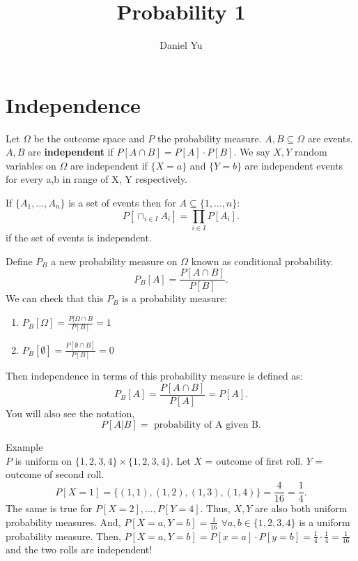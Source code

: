 \documentclass[a4paper]{article}
\title{\Huge{Probability 1}}
\author{\huge{Daniel Yu}}
\date{}
\begin{document}
\maketitle
\newpage%
\tableofcontents
\pagebreak
\section{Independence}

\begin{definition}
 Let $\Omega$ be the outcome space and $P$ the probability measure. $A,B \subseteq \Omega$ are events. $A,B$
 are \textbf{independent} if $P[A \cap B] = P[A] \cdot P[B]$. We say $X,Y$ random variables on $\Omega$ are independent
 if $\{X = a\}$ and $\{Y = b\}$ are independent events for every a,b in range of X, Y respectively.   
\end{definition}

\begin{theorem}
  If $\{A_1, \ldots, A_n\} $ is a set of events then for $A \subseteq \{1,\ldots,n\} $:
  \[
    P[\cap_{i \in I} A_i] = \prod_{i \in I} P[A_{i}]
  .\] 
  if the set of events is independent.
\end{theorem}

\begin{definition}
  Define  $P_B$ a new probability measure on  $\Omega$ known as conditional probability.
   \[
     P_B[A] = \frac{P[A\cap B]}{P[B]}
  .\] 
  We can check that this $P_B$ is a probability measure:
   \begin{enumerate}
     \item $P_B [\Omega] = \frac{P[\Omega \cap B}{P[B]} = 1$ 
     \item $P_B[\emptyset] = \frac{P[\emptyset \cap B]}{P[B]} = 0$ 
  \end{enumerate}
  Then independence in terms of this probability measure is defined as:
  \[
    P_B[A] = \frac{P[A \cap B]}{P[A]} = P[A]
  .\]
  You will also see the notation,
  \[
    P[A|B] = \text{ probability of A given B}
  .\] 
\end{definition}

\begin{note}{Example} \\
  $P$ is uniform on  $\{1,2,3,4\} \times \{1,2,3,4\}$. Let $X$ = outcome of first roll. $Y$ = outcome of second roll.
   \[
     P[X = 1] = \{(1,1),(1,2),(1,3),(1,4)\} =\frac{4}{16}=\frac{1}{4}
  .\] 
  The same is true for $P[X=2], \ldots, P[Y=4]$. Thus, $X,Y$ are also both uniform probability measures. And,
  $P[X=a,Y=b] = \frac{1}{16}$ $\forall a,b \in \{1,2,3,4\}$ is a uniform probability measure. Then,
  $P[X=a,Y=b] = P[x=a] \cdot P[y=b] = \frac{1}{4} \cdot \frac{1}{4} = \frac{1}{16}$ and the two rolls
  are independent!
\end{note}
\end{document}
